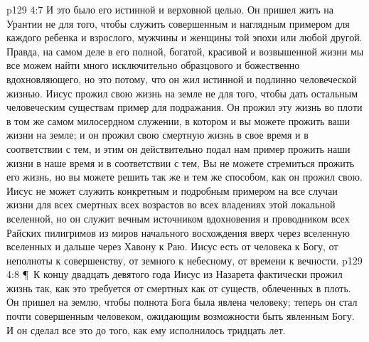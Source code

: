 \vs p129 4:7 И это было его истинной и верховной целью. Он пришел жить на Урантии не для того, чтобы служить совершенным и наглядным примером для каждого ребенка и взрослого, мужчины и женщины той эпохи или любой другой. Правда, на самом деле в его полной, богатой, красивой и возвышенной жизни мы все можем найти много исключительно образцового и божественно вдохновляющего, но это потому, что он жил истинной и подлинно человеческой жизнью. Иисус прожил свою жизнь на земле не для того, чтобы дать остальным человеческим существам пример для подражания. Он прожил эту жизнь во плоти в том же самом милосердном служении, в котором и вы можете прожить ваши жизни на земле; и он прожил свою смертную жизнь в свое время и в соответствии с тем,  и этим он действительно подал нам пример прожить наши жизни в наше время и в соответствии с тем,  Вы не можете стремиться прожить его жизнь, но вы можете решить  так же и тем же способом, как он прожил свою. Иисус не может служить конкретным и подробным примером на все случаи жизни для всех смертных всех возрастов во всех владениях этой локальной вселенной, но он служит вечным источником вдохновения и проводником всех Райских пилигримов из миров начального восхождения вверх через вселенную вселенных и дальше через Хавону к Раю. Иисус есть  от человека к Богу, от неполноты к совершенству, от земного к небесному, от времени к вечности.
\vs p129 4:8 \P\ К концу двадцать девятого года Иисус из Назарета фактически прожил жизнь так, как это требуется от смертных как от существ, облеченных в плоть. Он пришел на землю, чтобы полнота Бога была явлена человеку; теперь он стал почти совершенным человеком, ожидающим возможности быть явленным Богу. И он сделал все это до того, как ему исполнилось тридцать лет.
